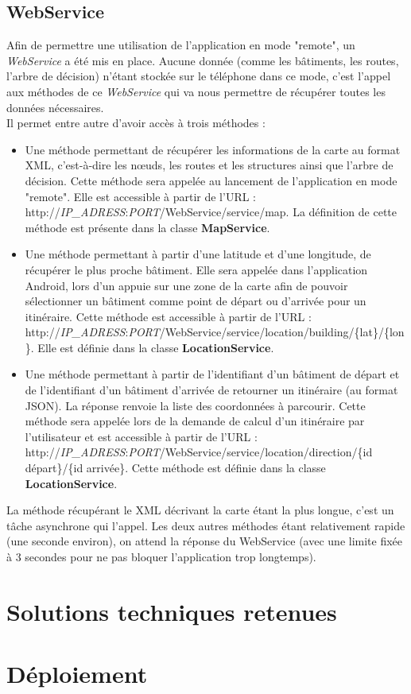 \documentclass[12pt,a4paper,oneside]{article}
\begin{document}
\newpage

\subsection{WebService}
Afin de permettre une utilisation de l'application en mode "remote", un \textit{WebService} a été mis en place. Aucune donnée (comme les bâtiments, les routes, l'arbre de décision) n'étant stockée sur le téléphone dans ce mode, c'est l'appel aux méthodes de ce \textit{WebService} qui va nous permettre de récupérer toutes les données nécessaires. \\
Il permet entre autre d'avoir accès à trois méthodes :\\
\begin{itemize}
\item Une méthode permettant de récupérer les informations de la carte au format XML, c'est-à-dire les nœuds, les routes et les structures ainsi que l'arbre de décision. Cette méthode sera appelée au lancement de l'application en mode "remote". Elle est accessible à partir de l'URL : http://\textit{IP\_ADRESS}:\textit{PORT}/WebService/service/map. La définition de cette méthode est présente dans la classe \textbf{MapService}.
\item Une méthode permettant à partir d'une latitude et d'une longitude, de récupérer le plus proche bâtiment. Elle sera appelée dans l'application Android, lors d'un appuie sur une zone de la carte afin de pouvoir sélectionner un bâtiment comme point de départ ou d'arrivée pour un itinéraire. Cette méthode est accessible à partir de l'URL : http://\textit{IP\_ADRESS}:\textit{PORT}/WebService/service/location/building/\{lat\}/\{lon\}. Elle est définie dans la classe \textbf{LocationService}.
\item Une méthode permettant à partir de l'identifiant d'un bâtiment de départ et de l'identifiant d'un bâtiment d'arrivée de retourner un itinéraire (au format JSON). La réponse renvoie la liste des coordonnées à parcourir. Cette méthode sera appelée lors de la demande de calcul d'un itinéraire par l'utilisateur et est accessible à partir de l'URL : http://\textit{IP\_ADRESS}:\textit{PORT}/WebService/service/location/direction/\{id départ\}/\{id arrivée\}. Cette méthode est définie dans la classe \textbf{LocationService}.\\
\end{itemize}

La méthode récupérant le XML décrivant la carte étant la plus longue, c'est un tâche asynchrone qui l'appel. Les deux autres méthodes étant relativement rapide (une seconde environ), on attend la réponse du WebService (avec une limite fixée à 3 secondes pour ne pas bloquer l'application trop longtemps). 

\newpage

\section{Solutions techniques retenues}





\section{Déploiement}

\appendix
\end{document}
